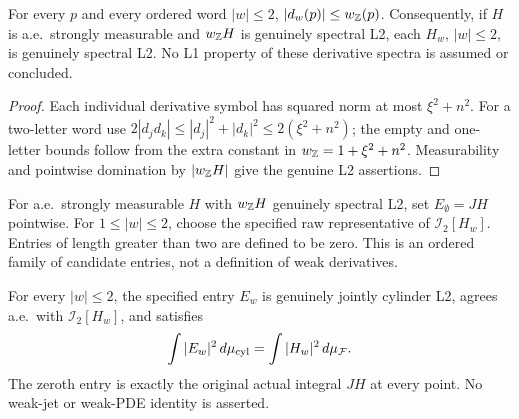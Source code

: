 \begin{lemma}
\label{lem:cylinder-spectral-jet-l2}
\leanok
For every $p$ and every ordered word $|w|\le2$,
$|d_w(p)|\le w_{\mathbb{Z}}(p)$.
Consequently, if $H$ is a.e.\ strongly measurable and $w_{\mathbb{Z}}H$ is genuinely
spectral L2, each $H_w$, $|w|\le2$, is genuinely spectral L2.
No L1 property of these derivative spectra is assumed or concluded.
\end{lemma}

\begin{proof}
\leanok
Each individual derivative symbol has squared norm at most $\xi^2+n^2$.
For a two-letter word use
$2|d_jd_k|\le |d_j|^2+|d_k|^2\le2(\xi^2+n^2)$;
the empty and one-letter bounds follow from the extra constant in
$w_{\mathbb{Z}}=1+\xi^2+n^2$. Measurability and pointwise domination by
$|w_{\mathbb{Z}}H|$ give the genuine L2 assertions.
\end{proof}

\begin{definition}
\label{def:cylinder-inverse-jet-entries}
\leanok
For a.e.\ strongly measurable $H$ with $w_{\mathbb{Z}}H$ genuinely spectral L2,
set $E_\emptyset=JH$ pointwise. For $1\le|w|\le2$, choose the specified raw
representative of $\mathcal I_2[H_w]$. Entries of length greater than two
are defined to be zero. This is an ordered family of candidate entries,
not a definition of weak derivatives.
\end{definition}

\begin{lemma}
\label{lem:cylinder-inverse-jet-candidates}
\leanok
For every $|w|\le2$, the specified entry $E_w$ is genuinely jointly cylinder L2,
agrees a.e.\ with $\mathcal I_2[H_w]$, and satisfies
\[
 \int|E_w|^2\,d\mu_{\rm cyl}=\int|H_w|^2\,d\mu_{\mathcal F}.
\]
The zeroth entry is exactly the original actual integral $JH$ at every point.
No weak-jet or weak-PDE identity is asserted.
\end{lemma}

